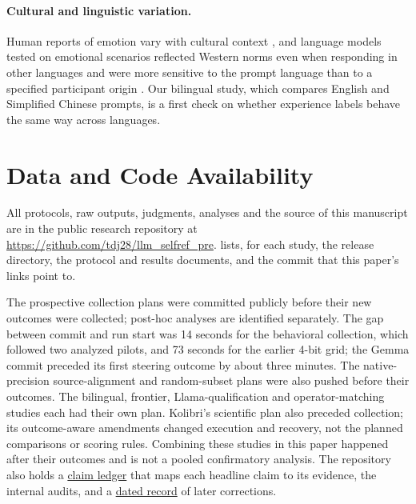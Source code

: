 \documentclass[11pt]{article}
\newcommand{\reviewartifact}[2]{\href{https://github.com/tdj28/llm_selfref_pre/blob/47ca3eda21c8df67dd4fc09bcf4ccac10c2fd4eb/#1}{#2}}
\newcommand{\mainartifact}[2]{\href{https://github.com/tdj28/llm_selfref_pre/blob/99078186076d1c2bd0e3f0ac909f96d78d7cda03/#1}{#2}}
\begin{document}
\paragraph{Cultural and linguistic variation.}
Human reports of emotion vary with cultural context
\citep{spencerrodgers2010dialecticism}, and language models tested on
emotional scenarios reflected Western norms even when responding in other
languages \citep{havaldar2023multilingual} and were more sensitive to the
prompt language than to a specified participant origin
\citep{dudy2024analyzing}. Our bilingual study, which compares English and
Simplified Chinese prompts, is a first check on whether experience labels
behave the same way across languages.

\FloatBarrier
\section{Data and Code Availability}\label{app:provenance}\label{app:ensemble-portability}

All protocols, raw outputs, judgments, analyses and the source of this
manuscript are in the public research repository \citep{jones2026evidence} at
\url{https://github.com/tdj28/llm_selfref_pre}.  lists, for
each study, the release directory,
the protocol and results documents, and the commit that this paper's links
point to.

The prospective collection plans were committed publicly before their new
outcomes were collected; post-hoc analyses are identified separately. The gap
between commit and run start was 14 seconds for the behavioral collection,
which followed two analyzed pilots, and 73 seconds for the earlier 4-bit
grid; the Gemma commit preceded its first steering outcome by about three
minutes. The native-precision
source-alignment and random-subset plans were also pushed before their
outcomes. The bilingual, frontier, Llama-qualification and operator-matching
studies each had their own plan. Kolibri's scientific plan also preceded
collection; its outcome-aware amendments changed execution and recovery,
not the planned comparisons or scoring rules. Combining these studies in this paper happened after
their outcomes and is not a pooled confirmatory analysis. The repository also
holds a \reviewartifact{docs/CLAIM_LEDGER.md}{claim ledger} that maps each
headline claim to its evidence, the internal audits, and a
\mainartifact{docs/ANALYSIS_CHRONOLOGY.md}{dated record} of later
corrections.
\end{document}
